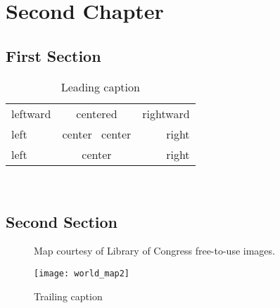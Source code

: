 
\chapter{Second Chapter}

\lipsum[21-22]

\section{First Section}

\lipsum[23]

\begin{table}[h!]
	\begin{center}
		\caption{Leading caption}
		\label{tab1}
		\begin{tabular}{l||c||r|} \hline
			leftward & centered              & rightward\\
			\cline{2-3}
			left     & center \vline\ center & right\\
			\cline{2-3}
			left     & center                & right\\
			\hline
		\end{tabular}\\[0.5ex]
	\end{center}
\end{table}

\section{Second Section}

\lipsum[25]

\begin{figure}[h!]
	\begin{minipage}{5.9in}
	    {\mdseries\footnotesize\textsf{\hspace{14em}Map courtesy of Library of Congress free-to-use images.}}
		\begin{center}
			{\vspace{-1.5ex}}
			\texttt{[image: world\_map2]}
		    \caption{Trailing caption}
		    \label{fig:map2} 
	    \end{center}
    \end{minipage}
\end{figure}


